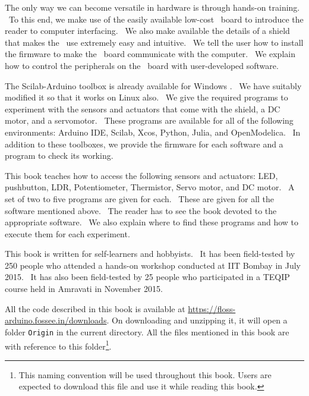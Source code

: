 The only way we can become versatile in hardware is through hands-on
training.  To this end, we make use of the easily available low-cost
\arduino\ board to introduce the reader to computer interfacing.  We
also make available the details of a shield that makes the
\arduino\ use extremely easy and intuitive.  We tell the user how to
install the firmware to make the \arduino\ board communicate with the
computer.  We explain how to control the peripherals on the
\arduino\ board with user-developed software.

The Scilab-Arduino toolbox is already available for Windows
\cite{scilab-arduino}.  We have suitably modified it so that it works
on Linux also.  We give the required programs to experiment with the
sensors and actuators that come with the shield, a DC motor, and a
servomotor.  These programs are available for all of the following
environments: Arduino IDE, Scilab, Xcos, Python, Julia, and
OpenModelica.  In addition to these toolboxes, we provide the firmware
for each software and a program to check its working.

This book teaches how to access the following sensors and actuators:
LED, pushbutton, LDR, Potentiometer, Thermistor, Servo motor, and DC motor.  A set of two to five programs are given for each.  These are given for all the
software mentioned above.  The reader has to see the book devoted to
the appropriate software.  We also explain where to find these
programs and how to execute them for each experiment.

This book is written for self-learners and hobbyists.  It has been
field-tested by 250 people who attended a hands-on workshop conducted
at IIT Bombay in July 2015.  It has also been field-tested by 25
people who participated in a TEQIP course held in Amravati in November
2015.

All the code described in this book is available at
\url{https://floss-arduino.fossee.in/downloads}.  On
downloading and unzipping it, it will open a folder {\tt Origin} in
the current directory.  All the files mentioned in this book are
with reference to this folder\footnote{\label{fn:file-loc}This naming
  convention will be used throughout this book.  Users are expected to
  download this file and use it while reading this book.}.
